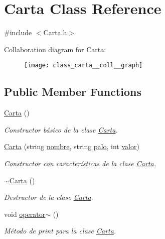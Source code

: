 \hypertarget{class_carta}{\section{Carta Class Reference}
\label{class_carta}
}


{\ttfamily \#include $<$Carta.\+h$>$}



Collaboration diagram for Carta\+:
\nopagebreak
\begin{figure}[H]
\begin{center}
\leavevmode
\texttt{[image: class\_carta\_\_coll\_\_graph]}
\end{center}
\end{figure}
\subsection*{Public Member Functions}
\begin{DoxyCompactItemize}
\item 
\hyperlink{class_carta_a769e6bdb8d3725177481b32e4dbbbd66}{Carta} ()
\begin{DoxyCompactList}\small\item\em Constructor básico de la clase \hyperlink{class_carta}{Carta}. \end{DoxyCompactList}\item 
\hyperlink{class_carta_a0801c30475b4d0331e42e29b96300142}{Carta} (string \hyperlink{class_carta_af9ecddff3f4ac2ffe4a00a5ec62a3b29}{nombre}, string \hyperlink{class_carta_a708b56ce311c1ea2329a76c60d740881}{palo}, int \hyperlink{class_carta_a40ed698935c3b770a0b118dea14c667b}{valor})
\begin{DoxyCompactList}\small\item\em Constructor con características de la clase \hyperlink{class_carta}{Carta}. \end{DoxyCompactList}\item 
\hyperlink{class_carta_ae3f30ed1ac1712b56330186f9e2139ec}{$\sim$\+Carta} ()
\begin{DoxyCompactList}\small\item\em Destructor de la clase \hyperlink{class_carta}{Carta}. \end{DoxyCompactList}\item 
void \hyperlink{class_carta_a0e5b4b65152cb3a1147c1dcb019f7def}{operator$\sim$} ()
\begin{DoxyCompactList}\small\item\em Método de print para la clase \hyperlink{class_carta}{Carta}. \end{DoxyCompactList}\end{DoxyCompactItemize}
